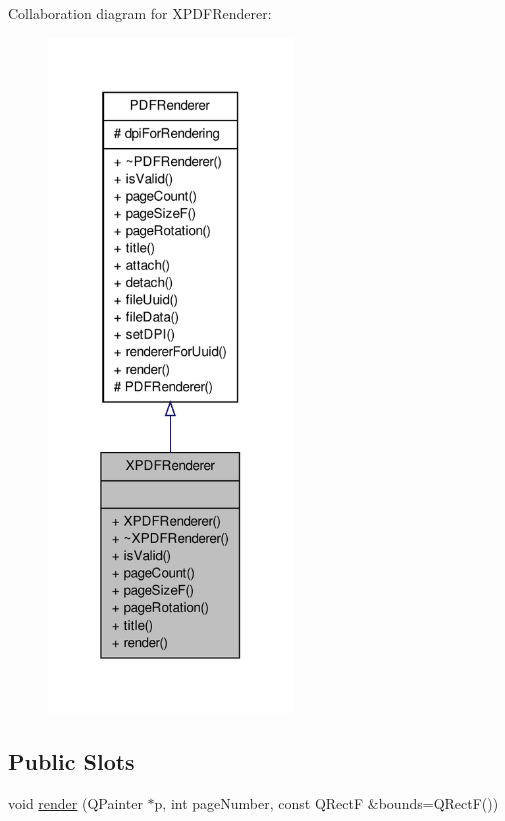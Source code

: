 Collaboration diagram for X\-P\-D\-F\-Renderer\-:
\nopagebreak
\begin{figure}[H]
\begin{center}
\leavevmode
\includegraphics[width=184pt]{dc/d4e/class_x_p_d_f_renderer__coll__graph}
\end{center}
\end{figure}
\subsection*{Public Slots}
\begin{DoxyCompactItemize}
\item 
void \hyperlink{class_x_p_d_f_renderer_aac80147a1471e9dee2bc1529c2a99731}{render} (Q\-Painter $\ast$p, int page\-Number, const Q\-Rect\-F \&bounds=Q\-Rect\-F())
\end{DoxyCompactItemize}

